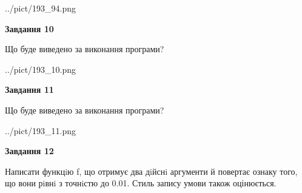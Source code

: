 \documentclass[12pt, ukrainian]{article}
\begin{document}
{\begin {large}
\begin{center}
	{../pict/193_94.png}
\end{center}
\newpage

{\begin {center}\textbf{Завдання 10}\end {center}}

Що буде виведено за виконання програми?\par
\begin{center}
	{../pict/193_10.png}
\end{center}
\newpage

{\begin {center}\textbf{Завдання 11}\end {center}}

Що буде виведено за виконання програми?\par
\begin{center}
	{../pict/193_11.png}
\end{center}
\newpage

{\begin {center}\textbf{Завдання 12}\end {center}}


Написати функцiю f, що отримує два дiйснi аргументи й повертає ознаку того, що вони рiвнi з точнiстю до 0.01. Стиль запису умови також оцінюється.\par
\newpage

\end {large}}
\end{document}
